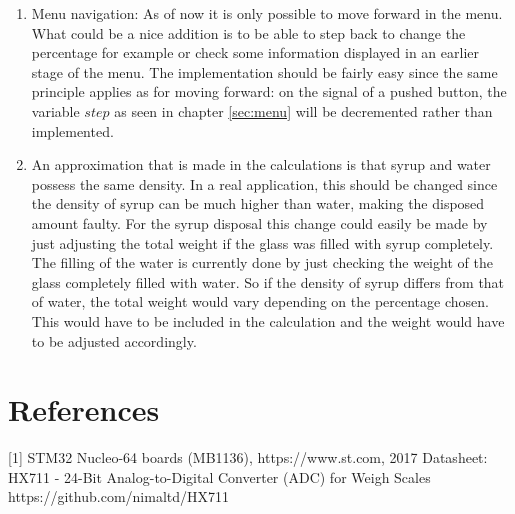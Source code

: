 \documentclass[twocolumn]{article}
\begin{document}
	\begin{enumerate}
		\item Menu navigation: As of now it is only possible to move forward in the menu. What could be a nice addition is to be able to step back to change the percentage for example or check some information displayed in an earlier stage of the menu. The implementation should be fairly easy since the same principle applies as for moving forward: on the signal of a pushed button, the variable $step$ as seen in chapter \ref{sec:menu} will be decremented rather than implemented.
		\item An approximation that is made in the calculations is that syrup and water possess the same density. In a real application, this should be changed since the density of syrup can be much higher than water, making the disposed amount faulty. For the syrup disposal this change could easily be made by just adjusting the total weight if the glass was filled with syrup completely. The filling of the water is currently done by just checking the weight of the glass completely filled with water. So if the density of syrup differs from that of water, the total weight would vary depending on the percentage chosen. This would have to be included in the calculation and the weight would have to be adjusted accordingly.
	\end{enumerate} 

	
	\section*{References}
	[1] STM32 Nucleo-64 boards (MB1136), https://www.st.com, 2017 \newline 
	[2] Datasheet: HX711 - 24-Bit Analog-to-Digital Converter (ADC) for Weigh Scales
	\newline
	[3] https://github.com/nimaltd/HX711
\end{document}
